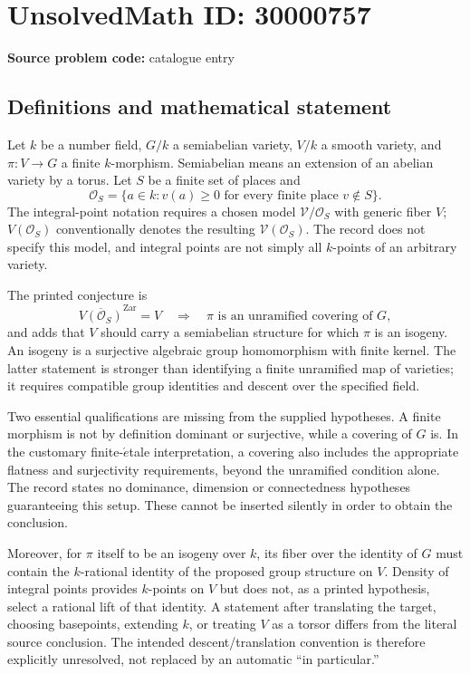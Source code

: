 \documentclass[11pt]{article}
\begin{document}
\section*{UnsolvedMath ID: 30000757}
\textbf{Source problem code:} catalogue entry
\subsection{Definitions and mathematical statement}
Let \(k\) be a number field, \(G/k\) a semiabelian variety, \(V/k\) a smooth variety, and \(\pi:V\to G\) a finite \(k\)-morphism. Semiabelian means an extension of an abelian variety by a torus. Let \(S\) be a finite set of places and
\[
 \mathcal O_S=\{a\in k:v(a)\geq0\text{ for every finite place }v\notin S\}.
\]
The integral-point notation requires a chosen model \(\mathcal V/\mathcal O_S\) with generic fiber \(V\); \(V(\mathcal O_S)\) conventionally denotes the resulting \(\mathcal V(\mathcal O_S)\). The record does not specify this model, and integral points are not simply all \(k\)-points of an arbitrary variety.

The printed conjecture is
\[
 \overline{V(\mathcal O_S)}^{\mathrm{Zar}}=V
 \quad\Longrightarrow\quad
 \pi\text{ is an unramified covering of }G,
\]
and adds that \(V\) should carry a semiabelian structure for which \(\pi\) is an isogeny. An isogeny is a surjective algebraic group homomorphism with finite kernel. The latter statement is stronger than identifying a finite unramified map of varieties; it requires compatible group identities and descent over the specified field.

Two essential qualifications are missing from the supplied hypotheses. A finite morphism is not by definition dominant or surjective, while a covering of \(G\) is. In the customary finite-\(\acute{e}\)tale interpretation, a covering also includes the appropriate flatness and surjectivity requirements, beyond the unramified condition alone. The record states no dominance, dimension or connectedness hypotheses guaranteeing this setup. These cannot be inserted silently in order to obtain the conclusion.

Moreover, for \(\pi\) itself to be an isogeny over \(k\), its fiber over the identity of \(G\) must contain the \(k\)-rational identity of the proposed group structure on \(V\). Density of integral points provides \(k\)-points on \(V\) but does not, as a printed hypothesis, select a rational lift of that identity. A statement after translating the target, choosing basepoints, extending \(k\), or treating \(V\) as a torsor differs from the literal source conclusion. The intended descent/translation convention is therefore explicitly unresolved, not replaced by an automatic ``in particular.''
\end{document}
